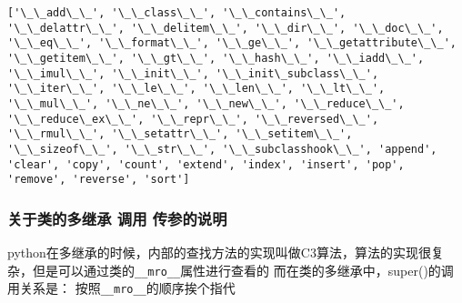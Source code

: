\documentclass[11pt]{article}
\begin{document}
    \begin{Verbatim}[commandchars=\\\{\}]
['\_\_add\_\_', '\_\_class\_\_', '\_\_contains\_\_', '\_\_delattr\_\_', '\_\_delitem\_\_', '\_\_dir\_\_', '\_\_doc\_\_', '\_\_eq\_\_', '\_\_format\_\_', '\_\_ge\_\_', '\_\_getattribute\_\_', '\_\_getitem\_\_', '\_\_gt\_\_', '\_\_hash\_\_', '\_\_iadd\_\_', '\_\_imul\_\_', '\_\_init\_\_', '\_\_init\_subclass\_\_', '\_\_iter\_\_', '\_\_le\_\_', '\_\_len\_\_', '\_\_lt\_\_', '\_\_mul\_\_', '\_\_ne\_\_', '\_\_new\_\_', '\_\_reduce\_\_', '\_\_reduce\_ex\_\_', '\_\_repr\_\_', '\_\_reversed\_\_', '\_\_rmul\_\_', '\_\_setattr\_\_', '\_\_setitem\_\_', '\_\_sizeof\_\_', '\_\_str\_\_', '\_\_subclasshook\_\_', 'append', 'clear', 'copy', 'count', 'extend', 'index', 'insert', 'pop', 'remove', 'reverse', 'sort']

    \end{Verbatim}

    \hypertarget{ux5173ux4e8eux7c7bux7684ux591aux7ee7ux627f-ux8c03ux7528-ux4f20ux53c2ux7684ux8bf4ux660e}{%
\subsubsection{关于类的多继承 调用
传参的说明}\label{ux5173ux4e8eux7c7bux7684ux591aux7ee7ux627f-ux8c03ux7528-ux4f20ux53c2ux7684ux8bf4ux660e}}

python在多继承的时候，内部的查找方法的实现叫做C3算法，算法的实现很复杂，但是可以通过类的\texttt{\_\_mro\_\_}属性进行查看的
而在类的多继承中，super()的调用关系是：
按照\texttt{\_\_mro\_\_}的顺序挨个指代
\end{document}
